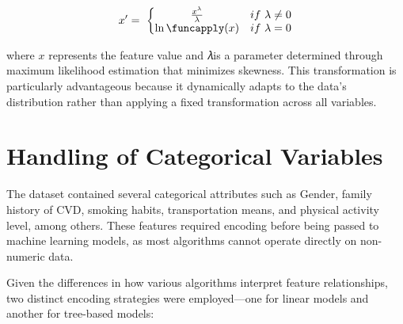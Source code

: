 \begin{equation}
    \centering
    x^\prime=\ \left\{
                   \begin{matrix}
                       \frac{x^\lambda}{\lambda}&if\ \lambda\neq0\\
                       \ln\funcapply(x)&if\ \lambda=0\\
                   \end{matrix}\right.
    \label{eq:eq_box_cox}
\end{equation}

where $x$ represents the feature value and 𝜆is a parameter determined through maximum likelihood estimation that minimizes skewness.
This transformation is particularly advantageous because it dynamically adapts to the data’s distribution rather than applying a fixed transformation across all variables.



\section{Handling of Categorical Variables}\label{sec:handling-of-categorical-variables}

The dataset contained several categorical attributes such as Gender, family history of CVD, smoking habits, transportation means, and physical activity level, among others.
These features required encoding before being passed to machine learning models, as most algorithms cannot operate directly on non-numeric data.

Given the differences in how various algorithms interpret feature relationships, two distinct encoding strategies were employed—one for linear models and another for tree-based models:

